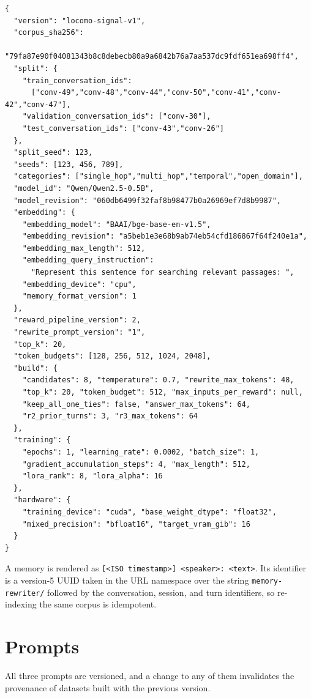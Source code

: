 \documentclass[12pt,letterpaper,oneside]{report}
\newcommand{\code}[1]{\texttt{\small #1}}
\begin{document}
\begin{singlespace}
\begin{lstlisting}
{
  "version": "locomo-signal-v1",
  "corpus_sha256":
    "79fa87e90f04081343b8c8debecb80a9a6842b76a7aa537dc9fdf651ea698ff4",
  "split": {
    "train_conversation_ids":
      ["conv-49","conv-48","conv-44","conv-50","conv-41","conv-42","conv-47"],
    "validation_conversation_ids": ["conv-30"],
    "test_conversation_ids": ["conv-43","conv-26"]
  },
  "split_seed": 123,
  "seeds": [123, 456, 789],
  "categories": ["single_hop","multi_hop","temporal","open_domain"],
  "model_id": "Qwen/Qwen2.5-0.5B",
  "model_revision": "060db6499f32faf8b98477b0a26969ef7d8b9987",
  "embedding": {
    "embedding_model": "BAAI/bge-base-en-v1.5",
    "embedding_revision": "a5beb1e3e68b9ab74eb54cfd186867f64f240e1a",
    "embedding_max_length": 512,
    "embedding_query_instruction":
      "Represent this sentence for searching relevant passages: ",
    "embedding_device": "cpu",
    "memory_format_version": 1
  },
  "reward_pipeline_version": 2,
  "rewrite_prompt_version": "1",
  "top_k": 20,
  "token_budgets": [128, 256, 512, 1024, 2048],
  "build": {
    "candidates": 8, "temperature": 0.7, "rewrite_max_tokens": 48,
    "top_k": 20, "token_budget": 512, "max_inputs_per_reward": null,
    "keep_all_one_ties": false, "answer_max_tokens": 64,
    "r2_prior_turns": 3, "r3_max_tokens": 64
  },
  "training": {
    "epochs": 1, "learning_rate": 0.0002, "batch_size": 1,
    "gradient_accumulation_steps": 4, "max_length": 512,
    "lora_rank": 8, "lora_alpha": 16
  },
  "hardware": {
    "training_device": "cuda", "base_weight_dtype": "float32",
    "mixed_precision": "bfloat16", "target_vram_gib": 16
  }
}
\end{lstlisting}
\end{singlespace}

A memory is rendered as \code{[<ISO timestamp>] <speaker>: <text>}. Its
identifier is a version-5 UUID taken in the URL namespace over the string
\code{memory-rewriter/} followed by the conversation, session, and turn
identifiers, so re-indexing the same corpus is idempotent.

\chapter{Prompts}
\label{app:prompts}

All three prompts are versioned, and a change to any of them invalidates the
provenance of datasets built with the previous version.
\end{document}
